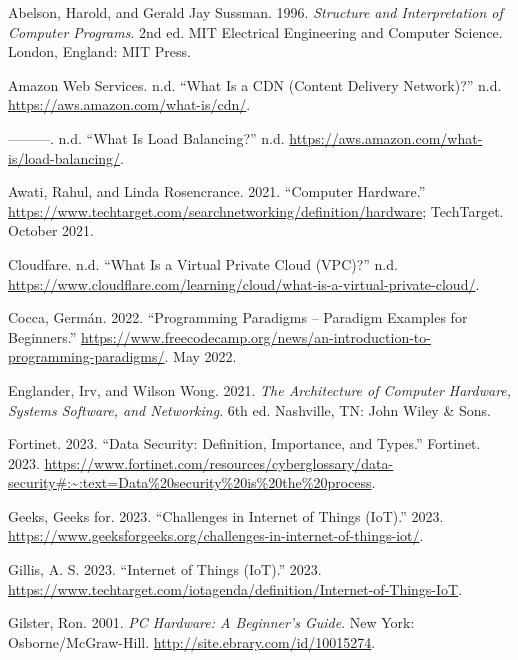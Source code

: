 \documentclass[
  letterpaper,
  DIV=11,
  numbers=noendperiod]{scrreprt}
\newlength{\cslhangindent}
\newenvironment{CSLReferences}[2] %
 {\begin{list}{}{%
  \setlength{\itemindent}{0pt}
  \setlength{\leftmargin}{0pt}
  \setlength{\parsep}{0pt}
  \ifodd #1
   \setlength{\leftmargin}{\cslhangindent}
   \setlength{\itemindent}{-1\cslhangindent}
  \fi
  \setlength{\itemsep}{#2\baselineskip}}}
 {\end{list}}
\begin{document}
\label{refs}
\begin{CSLReferences}{1}{0}
Abelson, Harold, and Gerald Jay Sussman. 1996. \emph{Structure and
Interpretation of Computer Programs}. 2nd ed. MIT Electrical Engineering
and Computer Science. London, England: MIT Press.

Amazon Web Services. n.d. {``What Is a CDN (Content Delivery
Network)?''} n.d. \url{https://aws.amazon.com/what-is/cdn/}.

---------. n.d. {``What Is Load Balancing?''} n.d.
\url{https://aws.amazon.com/what-is/load-balancing/}.

Awati, Rahul, and Linda Rosencrance. 2021. {``Computer Hardware.''}
\url{https://www.techtarget.com/searchnetworking/definition/hardware};
TechTarget. October 2021.

Cloudfare. n.d. {``What Is a Virtual Private Cloud (VPC)?''} n.d.
\url{https://www.cloudflare.com/learning/cloud/what-is-a-virtual-private-cloud/}.

Cocca, Germán. 2022. {``Programming Paradigms -- Paradigm Examples for
Beginners.''}
\url{https://www.freecodecamp.org/news/an-introduction-to-programming-paradigms/}.
May 2022.

Englander, Irv, and Wilson Wong. 2021. \emph{The Architecture of
Computer Hardware, Systems Software, and Networking}. 6th ed. Nashville,
TN: John Wiley \& Sons.

Fortinet. 2023. {``Data Security: Definition, Importance, and Types.''}
Fortinet. 2023.
\url{https://www.fortinet.com/resources/cyberglossary/data-security\#:~:text=Data\%20security\%20is\%20the\%20process}.

Geeks, Geeks for. 2023. {``Challenges in Internet of Things (IoT).''}
2023.
\url{https://www.geeksforgeeks.org/challenges-in-internet-of-things-iot/}.

Gillis, A. S. 2023. {``Internet of Things (IoT).''} 2023.
\url{https://www.techtarget.com/iotagenda/definition/Internet-of-Things-IoT}.

Gilster, Ron. 2001. \emph{{PC} Hardware: A Beginner's Guide}. New York:
Osborne/{McGraw}-Hill. \url{http://site.ebrary.com/id/10015274}.


\end{CSLReferences}
\end{document}
